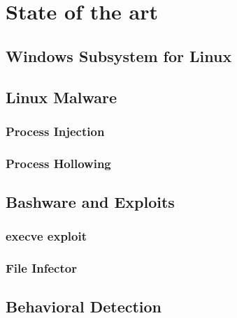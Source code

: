 \chapter{State of the art}
    \section{Windows Subsystem for Linux}
    \section{Linux Malware}
        \subsection{Process Injection}
        \subsection{Process Hollowing}
    \section{Bashware and Exploits}
        \subsection{execve exploit}
        \subsection{File Infector}
    \section{Behavioral Detection}
    